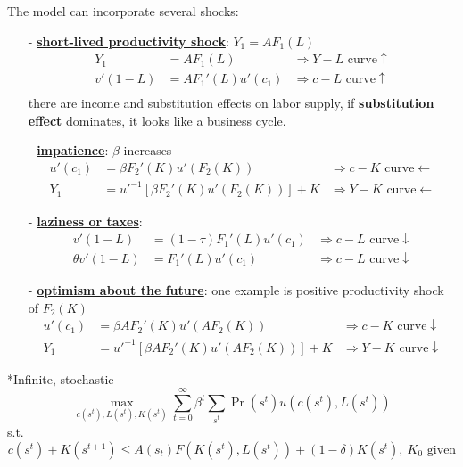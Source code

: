 \documentclass[10pt,a4paper]{article}
\makeatletter
\renewcommand{\subsection}{\@startsection{subsection}{1}{0mm}{.2ex}{.2ex}{\small\bfseries}}
\makeatother
\begin{document}
\begin{multicols*}{3}
The model can incorporate several shocks:
\begin{itemize}
    \item[-] \underline{\textbf{short-lived productivity shock}}: $Y_1 =AF_1(L)$
    \begin{align*}
        Y_1&=AF_1(L) &\Rightarrow Y-L \text{ curve} \uparrow\\
        v'(1-L)&=AF_1'(L)u'(c_1) &\Rightarrow c-L \text{ curve} \uparrow\\
    \end{align*}
    there are income and substitution effects on labor supply, if \textbf{substitution effect} dominates, it looks like a business cycle.
    \item[-] \underline{\textbf{impatience}}: $\beta$ increases
    \begin{align*}
        u'(c_1)&=\beta F_2'(K)u'(F_2(K)) & \Rightarrow c-K \text{ curve} \leftarrow\\
    Y_1 &= u'^{-1}\left[\beta F_2'(K)u'(F_2(K))\right]+K & \Rightarrow Y-K \text{ curve} \leftarrow
    \end{align*}
    \item[-] \underline{\textbf{laziness or taxes}}:
    \begin{align*}
        v'(1-L)&=(1-\tau)F_1'(L)u'(c_1) &\Rightarrow c-L \text{ curve} \downarrow\\
        \theta v'(1-L)&=F_1'(L)u'(c_1) &\Rightarrow c-L \text{ curve} \downarrow
    \end{align*}
    \item[-] \underline{\textbf{optimism about the future}}: one example is positive productivity shock of $F_2(K)$
    \begin{align*}
        u'(c_1) &= \beta AF_2'(K)u'(AF_2(K)) &\Rightarrow c-K \text{ curve} \downarrow\\
        Y_1 &= u'^{-1}\left[\beta AF_2'(K)u'(AF_2(K))\right]+K & \Rightarrow Y-K \text{ curve} \downarrow
    \end{align*}
\end{itemize}

\subsection*{Infinite, stochastic}
$$
\max_{c(s^t),L(s^t),K(s^t)}\sum^{\infty}_{t=0}\beta^t\sum_{s^t}\Pr (s^t)u\left( c(s^t),L(s^t) \right)
$$
s.t.
$$
c(s^t)+K(s^{t+1})\leq A(s_t)F(K(s^t),L(s^t))+(1-\delta)K(s^t),\ K_0\text{ given}
$$



\end{multicols*}
\end{document}
